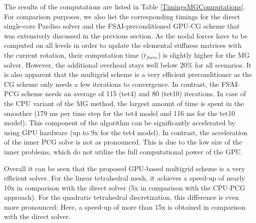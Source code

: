 The results of the computations are listed in Table \ref{TimingsMGComputations}. For comparison purposes, we also list the corresponding timings for the direct single-core Pardiso solver and the FSAI-preconditioned GPU-CG scheme that was extensively discussed in the previous section. As the nodal forces have to be computed on all levels in order to update the elemental stiffness matrices with the current rotation, their computation time ($t_{force}$) is slightly higher for the MG solver. However, the additional overhead stays well below $20\%$ for all scenarios. It is also apparent that the multigrid scheme is a very efficient preconditioner as the CG scheme only needs a few iterations to convergence. In contrast, the FSAI-PCG scheme needs an average of 115 (tet4) and 80 (tet10) iterations. In case of the CPU variant of the MG method, the largest amount of time is spent in the smoother (179 ms per time step for the tet4 model and 116 ms for the tet10 model). This component of the algorithm can be significantly accelerated by using GPU hardware (up to 9x for the tet4 model). In contrast, the acceleration of the inner PCG solve is not as pronounced. This is due to the low size of the inner problems, which do not utilize the full computational power of the GPU.

Overall it can be seen that the proposed GPU-based multigrid scheme is a very efficient solver. For the linear tetrahedral mesh, it achieves a speed-up of nearly 10x in comparison with the direct solver (5x in comparison with the CPU-PCG approach). For the quadratic tetrahedral discretization, this difference is even more pronounced: Here, a speed-up of more than 15x is obtained in comparison with the direct solver.


